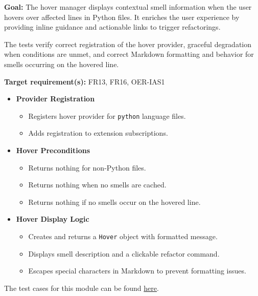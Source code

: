 \documentclass[12pt, titlepage]{article}
\begin{document}
\textbf{Goal:} The hover manager displays contextual smell information when the user hovers over affected lines in Python files. It enriches the user experience by providing inline guidance and actionable links to trigger refactorings.

\medskip

\noindent The tests verify correct registration of the hover provider, graceful degradation when conditions are unmet, and correct Markdown formatting and behavior for smells occurring on the hovered line.

\medskip

\noindent\textbf{Target requirement(s):} FR13, FR16, OER-IAS1~\cite{SRS}

\begin{itemize}
  \item \textbf{Provider Registration}
    \begin{itemize}
      \item Registers hover provider for \texttt{python} language files.
      \item Adds registration to extension subscriptions.
    \end{itemize}

  \item \textbf{Hover Preconditions}
    \begin{itemize}
      \item Returns nothing for non-Python files.
      \item Returns nothing when no smells are cached.
      \item Returns nothing if no smells occur on the hovered line.
    \end{itemize}

  \item \textbf{Hover Display Logic}
    \begin{itemize}
      \item Creates and returns a \texttt{Hover} object with formatted message.
      \item Displays smell description and a clickable refactor command.
      \item Escapes special characters in Markdown to prevent formatting issues.
    \end{itemize}
\end{itemize}

\noindent The test cases for this module can be found
\href{https://github.com/ssm-lab/capstone--sco-vs-code-plugin/blob/plugin-multi-file/test/ui/hoverManager.test.ts}{here}.
\end{document}

